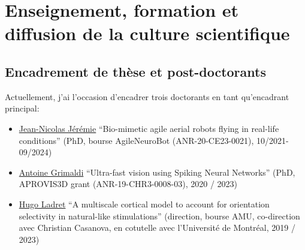 \documentclass[10pt,french,a4paper,oneside]{article}%
\begin{document}
\section{Enseignement, formation et diffusion de la culture scientifique} %

\subsection{Encadrement de thèse et post-doctorants} %

%
%


Actuellement, j'ai l'occasion d'encadrer trois doctorants %
en tant qu'encadrant principal:
\begin{itemize}
	\item \href{https://laurentperrinet.github.io/author/jean-nicolas-jeremie/}{Jean-Nicolas Jérémie} 	``Bio-mimetic agile aerial robots flying in real-life conditions'' (PhD, bourse AgileNeuroBot (ANR-20-CE23-0021), 10/2021-09/2024)
	\item \href{https://laurentperrinet.github.io/author/antoine-grimaldi/}{Antoine Grimaldi} ``Ultra-fast vision using Spiking Neural Networks'' (PhD, APROVIS3D grant (ANR-19-CHR3-0008-03), 2020 / 2023)
	\item \href{https://laurentperrinet.github.io/authors/hugo-ladret/}{Hugo Ladret} ``A multiscale cortical model to account for orientation selectivity in natural-like stimulations''  (direction, bourse AMU, co-direction avec Christian Casanova, en cotutelle avec l'Université de Montréal, 2019 / 2023)
\end{itemize}

\end{document}
